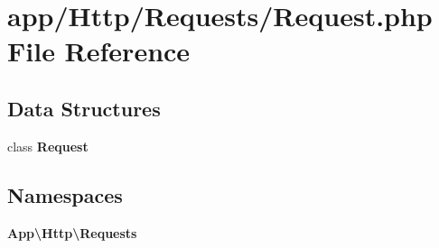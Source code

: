 \section{app/\+Http/\+Requests/\+Request.php File Reference}
\label{app_2_http_2_requests_2_request_8php}
\subsection*{Data Structures}
\begin{DoxyCompactItemize}
\item 
class {\bf Request}
\end{DoxyCompactItemize}
\subsection*{Namespaces}
\begin{DoxyCompactItemize}
\item 
 {\bf App\textbackslash{}\+Http\textbackslash{}\+Requests}
\end{DoxyCompactItemize}
